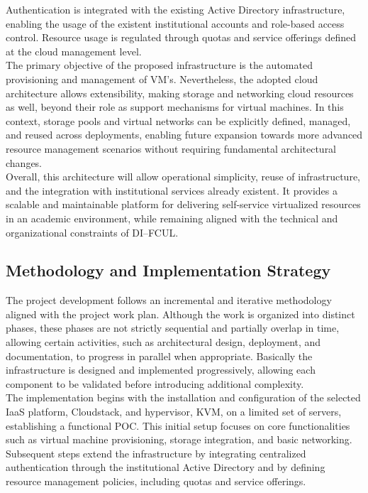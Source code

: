 \documentclass[sigplan]{acmart}
\begin{document}
        Authentication is integrated with the existing Active Directory infrastructure, enabling the usage of the existent institutional accounts and role-based access control. Resource usage is regulated through quotas and service offerings defined at the cloud management level.\\

        The primary objective of the proposed infrastructure is the automated provisioning and management of VM's. Nevertheless, the adopted cloud architecture allows extensibility, making storage and networking cloud resources as well, beyond their role as support mechanisms for virtual machines. In this context, storage pools and virtual networks can be explicitly defined, managed, and reused across deployments, enabling future expansion towards more advanced resource management scenarios without requiring fundamental architectural changes.\\
        
        Overall, this architecture will allow operational simplicity, reuse of infrastructure, and the integration with institutional services already existent. It provides a scalable and maintainable platform for delivering self-service virtualized resources in an academic environment, while remaining aligned with the technical and organizational constraints of DI–FCUL.

    
    \subsection{Methodology and Implementation Strategy}
        The project development follows an incremental and iterative methodology aligned with the project work plan. Although the work is organized into distinct phases, these phases are not strictly sequential and partially overlap in time, allowing certain activities, such as architectural design, deployment, and documentation, to progress in parallel when appropriate. Basically the infrastructure is designed and implemented progressively, allowing each component to be validated before introducing additional complexity.\\

        The implementation begins with the installation and configuration of the selected IaaS platform, Cloudstack, and hypervisor, KVM, on a limited set of servers, establishing a functional POC. This initial setup focuses on core functionalities such as virtual machine provisioning, storage integration, and basic networking. Subsequent steps extend the infrastructure by integrating centralized authentication through the institutional Active Directory and by defining resource management policies, including quotas and service offerings.\\
        
\end{document}

